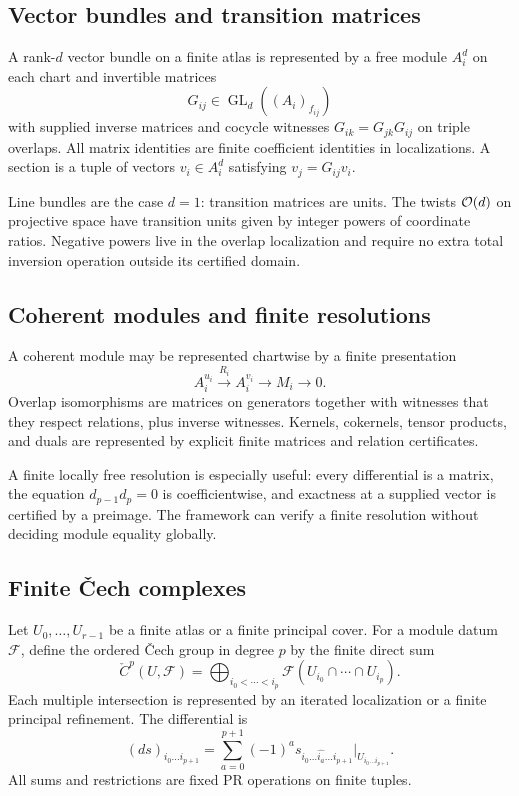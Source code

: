 \subsection{Vector bundles and transition matrices}

A rank-$d$ vector bundle on a finite atlas is represented by a free module $A_i^d$ on each chart and
invertible matrices
\[
                     G_{ij}\in\operatorname{GL}_d((A_i)_{f_{ij}})
\]
with supplied inverse matrices and cocycle witnesses $G_{ik}=G_{jk}G_{ij}$ on triple overlaps.
All matrix identities are finite coefficient identities in localizations.  A section is a tuple of
vectors $v_i\in A_i^d$ satisfying $v_j=G_{ij}v_i$.

Line bundles are the case $d=1$: transition matrices are units.  The twists $\mathcal O(d)$ on projective
space have transition units given by integer powers of coordinate ratios.  Negative powers live in
the overlap localization and require no extra total inversion operation outside its certified
domain.

\subsection{Coherent modules and finite resolutions}

A coherent module may be represented chartwise by a finite presentation
\[
                       A_i^{u_i}\xrightarrow{R_i}A_i^{v_i}\to M_i\to0.
\]
Overlap isomorphisms are matrices on generators together with witnesses that they respect relations,
plus inverse witnesses.  Kernels, cokernels, tensor products, and duals are represented by explicit
finite matrices and relation certificates.

A finite locally free resolution is especially useful: every differential is a matrix, the equation
$d_{p-1}d_p=0$ is coefficientwise, and exactness at a supplied vector is certified by a preimage.
The framework can verify a finite resolution without deciding module equality globally.

\subsection{Finite \v{C}ech complexes}

Let $U_0,\ldots,U_{r-1}$ be a finite atlas or a finite principal cover.  For a module datum
$\mathcal F$, define the ordered \v{C}ech group in degree $p$ by the finite direct sum
\[
 \check C^p(U,\mathcal F)
   =\bigoplus_{i_0<\cdots<i_p}
     \mathcal F(U_{i_0}\cap\cdots\cap U_{i_p}).
\]
Each multiple intersection is represented by an iterated localization or a finite principal
refinement.  The differential is
\[
   (ds)_{i_0\ldots i_{p+1}}
      =\sum_{a=0}^{p+1}(-1)^a
       s_{i_0\ldots\widehat{i_a}\ldots i_{p+1}}\big|_{U_{i_0\ldots i_{p+1}}}.
\]
All sums and restrictions are fixed PR operations on finite tuples.

